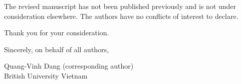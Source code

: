 \documentclass[11pt]{article}
\begin{document}
The revised manuscript has not been published previously and is not
under consideration elsewhere. The authors have no conflicts of interest
to declare.

Thank you for your consideration.

\vspace{14pt}
\noindent Sincerely, on behalf of all authors,

\vspace{6pt}
\noindent Quang-Vinh Dang (corresponding author)\\
British University Vietnam
\end{document}

